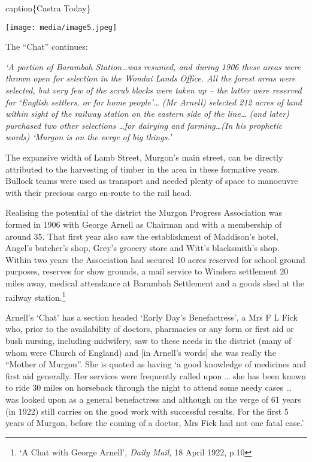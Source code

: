 caption\{Castra Today\}

\texttt{[image: media/image5.jpeg]}

The ``Chat'' continues:

\emph{`A portion of Barambah Station\ldots was resumed, and during 1906 these areas were thrown open for selection in the Wondai Lands Office. All the forest areas were selected, but very few of the scrub blocks were taken up -- the latter were reserved for `English settlers, or for home people'\ldots{} (Mr Arnell) selected 212 acres of land within sight of the railway station on the eastern side of the line\ldots{} (and later) purchased two other selections \ldots for dairying and farming\ldots(In his prophetic words) `Murgon is on the verge of big things.'}

The expansive width of Lamb Street, Murgon's main street, can be directly attributed to the harvesting of timber in the area in these formative years. Bullock teams were used as transport and needed plenty of space to manoeuvre with their precious cargo en-route to the rail head.

Realising the potential of the district the Murgon Progress Association was formed in 1906 with George Arnell as Chairman and with a membership of around 35. That first year also saw the establishment of Maddison's hotel, Angel's butcher's shop, Grey's grocery store and Witt's blacksmith's shop. Within two years the Association had secured 10 acres reserved for school ground purposes, reserves for show grounds, a mail service to Windera settlement 20 miles away, medical attendance at Barambah Settlement and a goods shed at the railway station.\footnote{`A Chat with George Arnell'\emph{, Daily Mail,} 18 April 1922, p.10}

Arnell's `Chat' has a section headed `Early Day's Benefactress', a Mrs F L Fick who, prior to the availability of doctors, pharmacies or any form or first aid or bush nursing, including midwifery, saw to these needs in the district (many of whom were Church of England) and {[}in Arnell's words{]} she was really the ``Mother of Murgon''. She is quoted as having `a good knowledge of medicines and first aid generally. Her services were frequently called upon \ldots{} she has been known to ride 30 miles on horseback through the night to attend some needy cases \ldots{} was looked upon as a general benefactress and although on the verge of 61 years (in 1922) still carries on the good work with successful results. For the first 5 years of Murgon, before the coming of a doctor, Mrs Fick had not one fatal case.'

